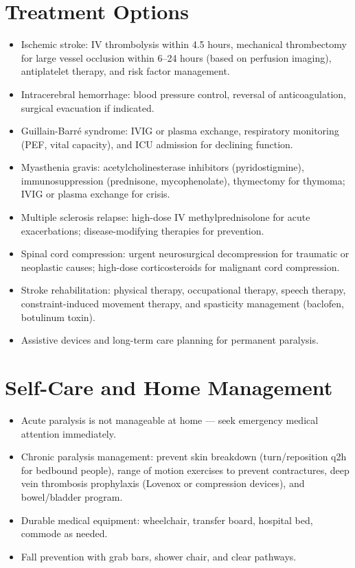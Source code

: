 \section*{Treatment Options}
\begin{itemize}
  \item Ischemic stroke: IV thrombolysis within 4.5 hours, mechanical thrombectomy for large vessel occlusion within 6--24 hours (based on perfusion imaging), antiplatelet therapy, and risk factor management.
  \item Intracerebral hemorrhage: blood pressure control, reversal of anticoagulation, surgical evacuation if indicated.
  \item Guillain-Barr\'e syndrome: IVIG or plasma exchange, respiratory monitoring (PEF, vital capacity), and ICU admission for declining function.
  \item Myasthenia gravis: acetylcholinesterase inhibitors (pyridostigmine), immunosuppression (prednisone, mycophenolate), thymectomy for thymoma; IVIG or plasma exchange for crisis.
  \item Multiple sclerosis relapse: high-dose IV methylprednisolone for acute exacerbations; disease-modifying therapies for prevention.
  \item Spinal cord compression: urgent neurosurgical decompression for traumatic or neoplastic causes; high-dose corticosteroids for malignant cord compression.
  \item Stroke rehabilitation: physical therapy, occupational therapy, speech therapy, constraint-induced movement therapy, and spasticity management (baclofen, botulinum toxin).
  \item Assistive devices and long-term care planning for permanent paralysis.
\end{itemize}

\section*{Self-Care and Home Management}
\begin{itemize}
  \item Acute paralysis is not manageable at home --- seek emergency medical attention immediately.
  \item Chronic paralysis management: prevent skin breakdown (turn/reposition q2h for bedbound people), range of motion exercises to prevent contractures, deep vein thrombosis prophylaxis (Lovenox or compression devices), and bowel/bladder program.
  \item Durable medical equipment: wheelchair, transfer board, hospital bed, commode as needed.
  \item Fall prevention with grab bars, shower chair, and clear pathways.
\end{itemize}

